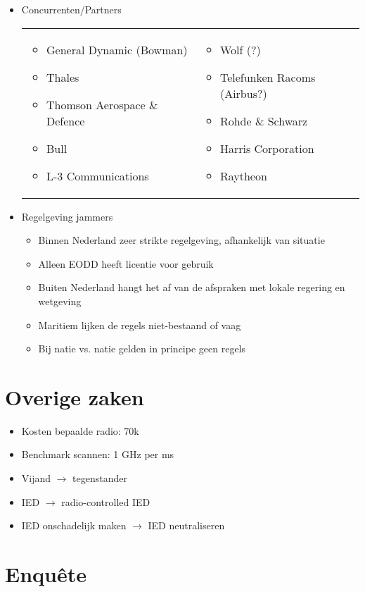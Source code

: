 \documentclass[12pt, a4paper]{article}
\begin{document}
\begin{itemize}
\begin{itemize}
        \item Concurrenten/Partners \\
        \begin{tabular}{p{}p{}}
            \begin{itemize}
                \item General Dynamic (Bowman)
                \item Thales
                \item Thomson Aerospace \& Defence
                \item Bull
                \item L-3 Communications
            \end{itemize} &

            \begin{itemize}
                \item Wolf (?)
                \item Telefunken Racoms (Airbus?)
                \item Rohde \& Schwarz
                \item Harris Corporation
                \item Raytheon
            \end{itemize} \\
        \end{tabular}

        \item Regelgeving jammers
        \begin{itemize}
            \item Binnen Nederland zeer strikte regelgeving, afhankelijk van situatie
            \item Alleen EODD heeft licentie voor gebruik
            \item Buiten Nederland hangt het af van de afspraken met lokale regering en wetgeving
            \item Maritiem lijken de regels niet-bestaand of vaag
            \item Bij natie vs. natie gelden in principe geen regels
        \end{itemize}
    \end{itemize}
\end{itemize}

\section{Overige zaken}
\begin{itemize}
    \item Kosten bepaalde radio: 70k
    \item Benchmark scannen: 1 GHz per ms
    \item Vijand $\rightarrow$ tegenstander
    \item IED $\rightarrow$ radio-controlled IED
    \item IED onschadelijk maken $\rightarrow$ IED neutraliseren
\end{itemize}

\section{Enquête}
\end{document}

